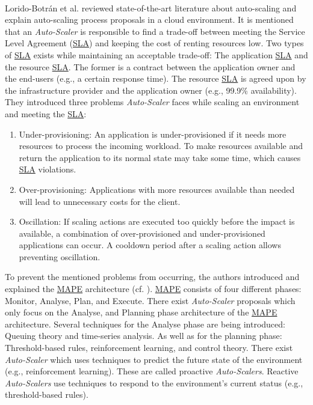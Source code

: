\paragraph{}
Lorido-Botrán et al. \cite{Lorido2014Review} reviewed state-of-the-art literature about auto-scaling and explain auto-scaling process proposals in a cloud environment.
It is mentioned that an \textit{Auto-Scaler} is responsible to find a trade-off between meeting the Service Level Agreement (\hyperlink{abbr:sla}{SLA}) and keeping the cost of renting resources low.
Two types of \hyperlink{abbr:sla}{SLA} exists while maintaining an acceptable trade-off: The application \hyperlink{abbr:sla}{SLA} and the resource \hyperlink{abbr:sla}{SLA}. The former is a contract between the application owner and the end-users (e.g., a certain response time). The resource \hyperlink{abbr:sla}{SLA} is agreed upon by the infrastructure provider and the application owner (e.g., 99.9\% availability).
They introduced three problems \textit{Auto-Scaler} faces while scaling an environment and meeting the \hyperlink{abbr:sla}{SLA}:
\begin{enumerate}
\item Under-provisioning:
An application is under-provisioned if it needs more resources to process the incoming workload.
To make resources available and return the application to its normal state may take some time, which causes \hyperlink{abbr:sla}{SLA} violations.
\item Over-provisioning:
Applications with more resources available than needed will lead to unnecessary costs for the client.
\item Oscillation:
If scaling actions are executed too quickly before the impact is available, a combination of over-provisioned and under-provisioned applications can occur.
A cooldown period after a scaling action allows preventing oscillation.
\end{enumerate}
To prevent the mentioned problems from occurring, the authors introduced and explained the \hyperlink{abbr:mape}{MAPE} architecture (cf. ).
\hyperlink{abbr:mape}{MAPE} consists of four different phases: Monitor, Analyse, Plan, and Execute.
There exist \textit{Auto-Scaler} proposals which only focus on the Analyse, and Planning phase architecture of the \hyperlink{abbr:mape}{MAPE} architecture.
Several techniques for the Analyse phase are being introduced: Queuing theory and time-series analysis.
As well as for the planning phase: Threshold-based rules, reinforcement learning, and control theory.
There exist \textit{Auto-Scaler} which uses techniques to predict the future state of the environment (e.g., reinforcement learning). These are called proactive \textit{Auto-Scalers}.
Reactive \textit{Auto-Scalers} use techniques to respond to the environment's current status (e.g., threshold-based rules).


